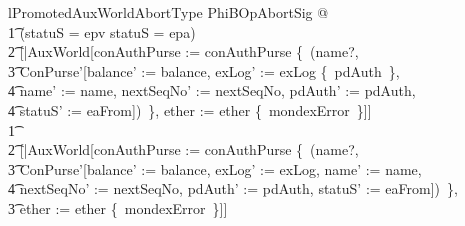 \begin{LNewLemma}
\begin{theorem}{lPromotedAuxWorldAbortType}
   \forall PhiBOpAbortSig @ \\
        \t1 \IF (statuS = epv \lor  statuS = epa) \THEN  \\
            \t2 [|AuxWorld[conAuthPurse := conAuthPurse \oplus \{~(name?, \\
                \t3 \theta ConPurse'[balance' := balance, exLog' := exLog \cup \{~pdAuth~\}, \\
                    \t4  name' := name, nextSeqNo' := nextSeqNo, pdAuth' := pdAuth,\\
                    \t4 statuS' := eaFrom])~\}, ether := ether \cup  \{~mondexError~\}]] \\
        \t1 \ELSE  \\
            \t2 [|AuxWorld[conAuthPurse := conAuthPurse \oplus \{~(name?, \\
                \t3 \theta ConPurse'[balance' := balance, exLog' := exLog, name' := name, \\
                    \t4 nextSeqNo' := nextSeqNo, pdAuth' := pdAuth, statuS' := eaFrom])~\}, \\
                \t3 ether := ether \cup  \{~mondexError~\}]]
\end{theorem}~\end{LNewLemma}

